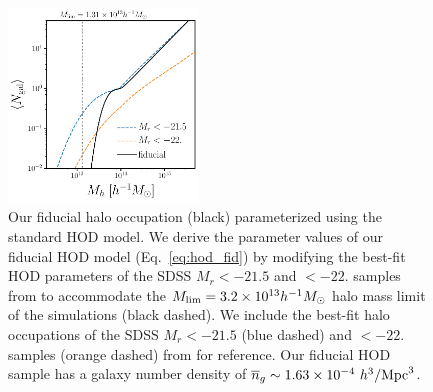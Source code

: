 \begin{figure}
\begin{center}
    \includegraphics[width=0.45\textwidth]{figs/hod_fid.pdf} 
    \caption{Our fiducial halo occupation (black) parameterized using the
    standard \cite{zheng2007} HOD model. We derive the parameter values of our
    fiducial HOD model (Eq.~\ref{eq:hod_fid}) by modifying the best-fit HOD
    parameters of the SDSS $M_r < -21.5$ and $< -22.$ samples from
    \cite{zheng2007} to accommodate the 
    $M_{\rm lim} = 3.2\times 10^{13} h^{-1}M_\odot$ halo mass limit of the 
    \quij simulations (black dashed). We include the best-fit halo occupations
    of the SDSS  $M_r < -21.5$ (blue dashed) and $< -22.$ samples (orange
    dashed) from \cite{zheng2007} for reference. Our fiducial HOD sample has a
    galaxy number density of $\overline{n}_g \sim 1.63\times10^{-4}~h^3/{\rm
    Mpc}^3$.
    }\label{fig:hod}
\end{center}
\end{figure}

